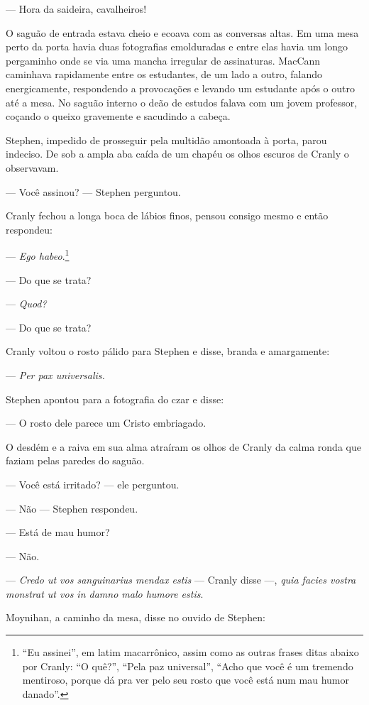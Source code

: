  --- Hora da saideira, cavalheiros!

O saguão de entrada estava cheio e ecoava com as conversas altas. Em uma
mesa perto da porta havia duas fotografias emolduradas e entre elas
havia um longo pergaminho onde se via uma mancha irregular de
assinaturas. MacCann caminhava rapidamente entre os estudantes, de um
lado a outro, falando energicamente, respondendo a provocações e
levando um estudante após o outro até a mesa. No saguão interno o deão
de estudos falava com um jovem professor, coçando o queixo gravemente e
sacudindo a cabeça.

Stephen, impedido de prosseguir pela multidão amontoada à porta, parou
indeciso. De sob a ampla aba caída de um chapéu os olhos escuros de
Cranly o observavam.

 --- Você assinou? --- Stephen perguntou.

Cranly fechou a longa boca de lábios finos, pensou consigo mesmo e então
respondeu:

 --- \textit{Ego habeo}.\footnote{ “Eu assinei”, em latim macarrônico, assim
como as outras frases ditas abaixo por Cranly: “O quê?”, “Pela paz
universal”, “Acho que você é um tremendo mentiroso, porque dá pra ver
pelo seu rosto que você está num mau humor danado”.}

 --- Do que se trata?

 --- \textit{Quod?}

 --- Do que se trata?

Cranly voltou o rosto pálido para Stephen e disse, branda e amargamente:

 --- \textit{Per pax universalis.}

 Stephen apontou para a fotografia do czar e disse:

 --- O rosto dele parece um Cristo embriagado.

O desdém e a raiva em sua alma atraíram os olhos de Cranly da calma
ronda que faziam pelas paredes do saguão.

 --- Você está irritado? --- ele perguntou.

 --- Não --- Stephen respondeu.

 --- Está de mau humor?

 --- Não.

 --- \textit{Credo ut vos sanguinarius mendax estis} --- Cranly disse ---,
\textit{quia facies vostra monstrat ut vos in damno malo humore estis}.

Moynihan, a caminho da mesa, disse no ouvido de Stephen:

